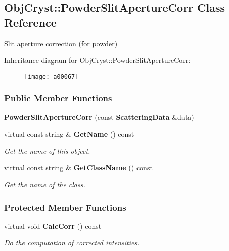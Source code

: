 \subsection{\-Obj\-Cryst\-:\-:\-Powder\-Slit\-Aperture\-Corr \-Class \-Reference}
\label{a00067}


\-Slit aperture correction (for powder)  


\-Inheritance diagram for \-Obj\-Cryst\-:\-:\-Powder\-Slit\-Aperture\-Corr\-:\begin{figure}[H]
\begin{center}
\leavevmode
\texttt{[image: a00067]}
\end{center}
\end{figure}
\subsubsection*{\-Public \-Member \-Functions}
\begin{DoxyCompactItemize}
\item 
{\bfseries \-Powder\-Slit\-Aperture\-Corr} (const {\bf \-Scattering\-Data} \&data)\label{a00067_a8c7814fd23c9e2fe96a904ea41137caf}

\item 
virtual const string \& {\bf \-Get\-Name} () const \label{a00067_a395cb337777d1c3fdd283f03c9a06e27}

\begin{DoxyCompactList}\small\item\em \-Get the name of this object. \end{DoxyCompactList}\item 
virtual const string \& {\bf \-Get\-Class\-Name} () const \label{a00067_a36c1dd123d3f951ba140796f47a68fbb}

\begin{DoxyCompactList}\small\item\em \-Get the name of the class. \end{DoxyCompactList}\end{DoxyCompactItemize}
\subsubsection*{\-Protected \-Member \-Functions}
\begin{DoxyCompactItemize}
\item 
virtual void {\bf \-Calc\-Corr} () const \label{a00067_ae7b2fecebc30de79ccc54f5237ec67f7}

\begin{DoxyCompactList}\small\item\em \-Do the computation of corrected intensities. \end{DoxyCompactList}\end{DoxyCompactItemize}


